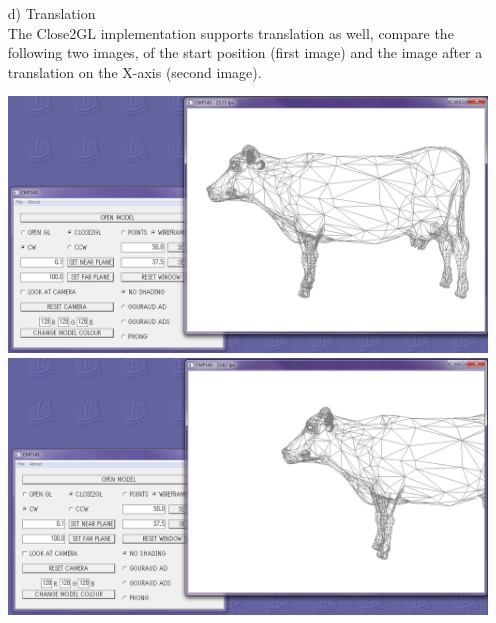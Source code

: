 \documentclass[12pt]{article}
\begin{document}
\begin{itemize}
\begin{itemize}
\item[d)] Translation\\
The Close2GL implementation supports translation as well, compare the following two images, of the start position (first image) and the image after a translation on the X-axis (second image).
\begin{center}
\includegraphics[scale=0.4]{8.png}
\includegraphics[scale=0.4]{9.png}
\end{center}


\end{itemize}
\end{itemize}
\end{document}
